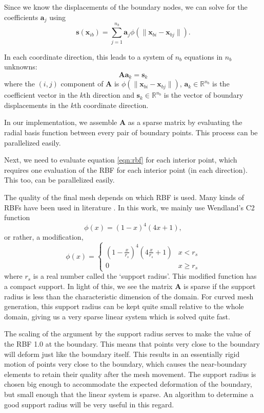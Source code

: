 \documentclass[letterpaper,11pt]{article}
\let\bld\boldsymbol
\begin{document}
Since we know the displacements of the boundary nodes, we can solve for the coefficients $\mathbf{a}_j$ using
\begin{equation}
\mathbf{s}(\mathbf{x}_{ib}) = \sum_{j=1}^{n_b} \mathbf{a}_j \phi(\lVert\mathbf{x}_{bi} - \mathbf{x}_{bj}\rVert).
\end{equation}

In each coordinate direction, this leads to a system of $n_b$ equations in $n_b$ unknowns:
\begin{equation}
\mathbf{A}\mathbf{a}_k = \mathbf{s}_k
\end{equation}
where the $(i,j)$ component of $\mathbf{A}$ is $\phi(\lVert\mathbf{x}_{bi} - \mathbf{x}_{bj} \rVert)$, $\bld{a}_k \in \mathbb{R}^{n_b}$ is the coefficient vector in the $k$th direction and $\bld{s}_k \in \mathbb{R}^{n_b}$ is the vector of boundary displacements in the $k$th coordinate direction.

In our implementation, we assemble $\mathbf{A}$ as a sparse matrix by evaluating the radial basis function between every pair of boundary points. This process can be parallelized easily.

Next, we need to evaluate equation \eqref{eqn:rbf} for each interior point, which requires one evaluation of the RBF for each interior point (in each direction). This too, can be parallelized easily.

The quality of the final mesh depends on which RBF is used. Many kinds of RBFs have been used in literature \cite{mm:rbf, mm:rbf2}. In this work, we mainly use Wendland's C2 function
\begin{equation}
\phi(x) = (1-x)^4(4x + 1),
\end{equation}
or rather, a modification,
\begin{equation}
\phi(x) = 
\begin{cases}
\left(1-\frac{x}{r_s}\right)^4\left(4\frac{x}{r_s} + 1\right) & x < r_s \\
0 & x \geq r_s
\end{cases}
\end{equation}
where $r_s$ is a real number called the `support radius'. This modified function has a compact support. In light of this, we see the matrix $\mathbf{A}$ is sparse if the support radius is less than the characteristic dimension of the domain. For curved mesh generation, this support radius can be kept quite small relative to the whole domain, giving us a very sparse linear system which is solved quite fast.

The scaling of the argument by the support radius serves to make the value of the RBF 1.0 at the boundary. This means that points very close to the boundary will deform just like the boundary itself. This results in an essentially rigid motion of points very close to the boundary, which causes the near-boundary elements to retain their quality after the mesh movement. The support radius is chosen big enough to accommodate the expected deformation of the boundary, but small enough that the linear system is sparse. An algorithm to determine a good support radius will be very useful in this regard.
\end{document}
